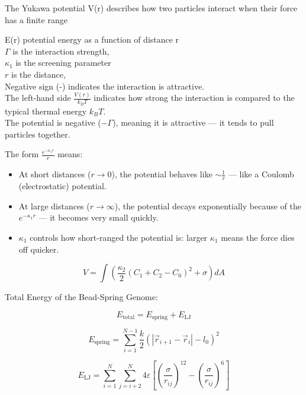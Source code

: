\documentclass[12pt]{article}
\begin{document}
\begin{flushleft}
The Yukawa potential V(r) describes how two particles interact when their force has a finite range

E(r) potential energy as a function of distance r\\
\(\Gamma\) is the interaction strength,\\
\(\kappa_1\) is the screening parameter \\
\(r\) is the distance, \\
Negative sign (-) indicates the interaction is attractive.\\
The left-hand side \( \frac{V(r)}{k_B T} \) indicates how strong the interaction is compared to the typical thermal energy \( k_B T \).\\

The potential is negative (\( -\Gamma \)), meaning it is attractive — it tends to pull particles together.

\noindent The form \( \frac{e^{-\kappa_1 r}}{r} \) means:

\begin{itemize}
    \item At short distances (\( r \to 0 \)), the potential behaves like \( \sim \frac{1}{r} \) — like a Coulomb (electrostatic) potential.
    \item At large distances (\( r \to \infty \)), the potential decays exponentially because of the \( e^{-\kappa_1 r} \) — it becomes very small quickly.
    \item \( \kappa_1 \) controls how short-ranged the potential is: larger \( \kappa_1 \) means the force dies off quicker.
\end{itemize}



\begin{equation}
V= \int \left( \frac{\kappa_2}{2} (C_1 + C_2 - C_0)^2 + \sigma \right) dA
\end{equation}


Total Energy of the Bead-Spring Genome:

\begin{equation}
E_{\text{total}} = E_{\text{spring}} + E_{\text{LJ}}
\end{equation}


\begin{equation}
E_{\text{spring}} = \sum_{i=1}^{N-1} \frac{k}{2} \left( \left| \vec{r}_{i+1} - \vec{r}_i \right| - l_0 \right)^2
\end{equation}


\begin{equation}
E_{\text{LJ}} = \sum_{i=1}^{N} \sum_{j=i+2}^{N} 4\varepsilon \left[ \left( \frac{\sigma}{r_{ij}} \right)^{12} - \left( \frac{\sigma}{r_{ij}} \right)^6 \right]
\end{equation}


\end{flushleft}
\end{document}
